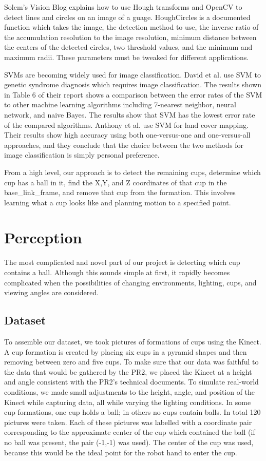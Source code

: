 \documentclass[letterpaper, 10 pt, conference]{ieeeconf}  %
\begin{document}
Solem’s Vision Blog explains how to use Hough transforms and OpenCV to detect lines and circles on an image of a guage. HoughCircles is a documented function which takes the image, the detection method to use, the inverse ratio of the accumulation resolution to the image resolution, minimum distance between the centers of the detected circles, two threshold values, and the minimum and maximum radii. These parameters must be tweaked for different applications.

SVMs are becoming widely used for image classification. David et al. use SVM to genetic syndrome diagnosis which requires image classification. The results shown in Table 6 of their report shows a comparison between the error rates of the SVM to other machine learning algorithms including 7-nearest neighbor, neural network, and naive Bayes. The results show that SVM has the lowest error rate of the compared algorithms. Anthony et al. use SVM for land cover mapping. Their results show high accuracy using both one-versus-one and one-versus-all approaches, and they conclude that the choice between the two methods for image classification is simply personal preference.

From a high level, our approach is to detect the remaining cups, determine which cup has a ball in it, find the X,Y, and Z coordinates of that cup in the base\_link\_frame, and remove that cup from the formation.  This involves learning what a cup looks like and planning motion to a specified point.

\section{Perception}
		
The most complicated and novel part of our project is detecting which cup contains a ball.  Although this sounds simple at first, it rapidly becomes complicated when the possibilities of changing environments, lighting, cups, and viewing angles are considered.

\subsection{Dataset}

To assemble our dataset, we took pictures of formations of cups using the Kinect.  A cup formation is created by placing six cups in a pyramid shapes and then removing between zero and five cups.  To make sure that our data was faithful to the data that would be gathered by the PR2, we placed the Kinect at a height and angle consistent with the PR2's technical documents.  To simulate real-world conditions, we made small adjustments to the height, angle, and position of the Kinect while capturing data, all while varying the lighting conditions.  In some cup formations, one cup holds a ball; in others no cups contain balls.  In total 120 pictures were taken.  Each of these pictures was labelled with a coordinate pair corresponding to the approximate center of the cup which contained the ball (if no ball was present, the pair (-1,-1) was used).  The center of the cup was used, because this would be the ideal point for the robot hand to enter the cup.
\end{document}
